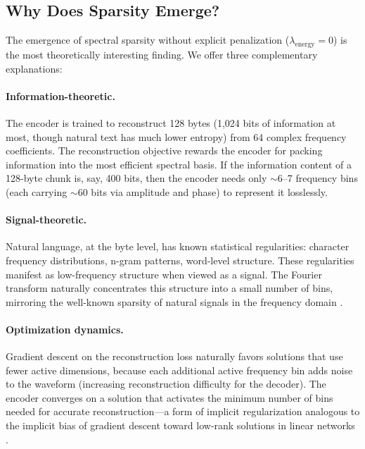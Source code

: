 \documentclass[10pt,twocolumn]{article}
\begin{document}
\subsection{Why Does Sparsity Emerge?}

The emergence of spectral sparsity without explicit penalization ($\lambda_\text{energy} = 0$) is the most theoretically interesting finding. We offer three complementary explanations:

\paragraph{Information-theoretic.} The encoder is trained to reconstruct 128 bytes (1,024 bits of information at most, though natural text has much lower entropy) from 64 complex frequency coefficients. The reconstruction objective rewards the encoder for packing information into the most efficient spectral basis. If the information content of a 128-byte chunk is, say, 400 bits, then the encoder needs only $\sim$6--7 frequency bins (each carrying $\sim$60 bits via amplitude and phase) to represent it losslessly.

\paragraph{Signal-theoretic.} Natural language, at the byte level, has known statistical regularities: character frequency distributions, n-gram patterns, word-level structure. These regularities manifest as low-frequency structure when viewed as a signal. The Fourier transform naturally concentrates this structure into a small number of bins, mirroring the well-known sparsity of natural signals in the frequency domain \cite{candes2006robust, donoho2006compressed}.

\paragraph{Optimization dynamics.} Gradient descent on the reconstruction loss naturally favors solutions that use fewer active dimensions, because each additional active frequency bin adds noise to the waveform (increasing reconstruction difficulty for the decoder). The encoder converges on a solution that activates the minimum number of bins needed for accurate reconstruction---a form of implicit regularization analogous to the implicit bias of gradient descent toward low-rank solutions in linear networks \cite{gunasekar2017implicit}.
\end{document}
